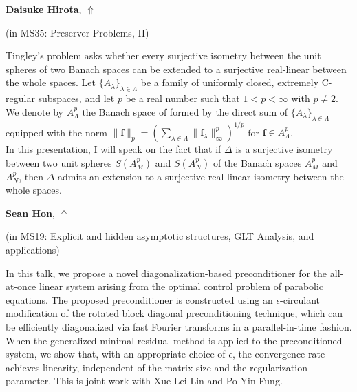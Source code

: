 \documentclass[ILAS2025-program.tex]{subfiles}
\begin{document}
\hypertarget{down0248}{}\begin{ilasabstract}
    
\textbf{Daisuke Hirota},  \hfill \hyperlink{up0248}{$\Uparrow$}
    
    
(in {\color{mstitle}MS35: Preserver Problems, II})
        
\mtskip
    Tingley's problem asks whether every surjective isometry between the unit spheres of two Banach spaces can be 
extended to a surjective real-linear  between the whole spaces. 
Let $\{A_{\lambda}\}_{\lambda\in\Lambda}$ be a family of uniformly closed, extremely C-regular subspaces,  
and 
let $p$ be a real number such that $1<p<\infty$ with $p\neq 2$. 
We denote by $A_{\Lambda}^{p}$ the Banach space of formed by the direct sum of $\{A_{\lambda}\}_{\lambda\in \Lambda}$ 
equipped with the norm $\|{\bm{f}}\|_{p}=\left(\sum_{\lambda\in \Lambda}\|{\bm{f}}_{\lambda}\|_{\infty}^{p}\right)^{1/p}$ for ${\bm{f}}\in A_{\Lambda}^{p}$. \\
\quad In this presentation, I will speak on the fact that
 if $\Delta$ is a surjective isometry between two unit spheres $S(A_{M}^{p})$ and $S(A_{N}^{p})$ of the Banach spaces 
 $A_{M}^{p}$ and $A_{N}^{p}$, 
 then $\Delta$ admits an extension to a surjective real-linear isometry between the whole spaces.
\end{ilasabstract}
    

\hypertarget{down0174}{}\begin{ilasabstract}
    
\textbf{Sean Hon},  \hfill \hyperlink{up0174}{$\Uparrow$}
    
    
(in {\color{mstitle}MS19: Explicit and hidden asymptotic structures, GLT Analysis, and applications})
        
\mtskip
    In this talk, we propose a novel diagonalization-based preconditioner for the all-at-once linear system arising from the optimal control problem of parabolic equations. The proposed preconditioner is constructed using an $\epsilon$-circulant modification of the rotated block diagonal preconditioning technique, which can be efficiently diagonalized via fast Fourier transforms in a parallel-in-time fashion. When the generalized minimal residual method is applied to the preconditioned system, we show that, with an appropriate choice of $\epsilon$, the convergence rate achieves linearity, independent of the matrix size and the regularization parameter. This is joint work with Xue-Lei Lin and Po Yin Fung.
\end{ilasabstract}
    
\end{document}
